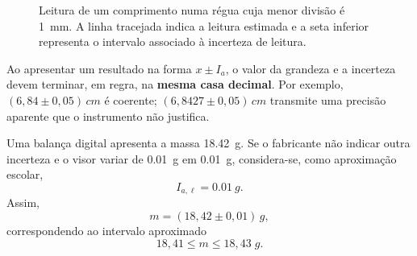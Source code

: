 \documentclass[11pt,a4paper,openany]{book}
\begin{document}
\begin{figure}[H]
\centering
{}
\caption{Leitura de um comprimento numa régua cuja menor divisão é \SI{1}{mm}. A linha tracejada indica a leitura estimada e a seta inferior representa o intervalo associado à incerteza de leitura.}
\label{fig:regua-incerteza}
\end{figure}

\begin{nota}
Ao apresentar um resultado na forma $x\pm I_a$, o valor da grandeza e a incerteza devem terminar, em regra, na \textbf{mesma casa decimal}. Por exemplo, $(6,84\pm0,05)\,\si{cm}$ é coerente; $(6,8427\pm0,05)\,\si{cm}$ transmite uma precisão aparente que o instrumento não justifica.
\end{nota}

\begin{exemploresolvido}
Uma balança digital apresenta a massa \SI{18.42}{g}. Se o fabricante não indicar outra incerteza e o visor variar de \SI{0.01}{g} em \SI{0.01}{g}, considera-se, como aproximação escolar,
\[
I_{a,\ell}=\SI{0.01}{g}.
\]
Assim,
\[
\boxed{m=(18,42\pm0,01)\,\si{g}},
\]
correspondendo ao intervalo aproximado
\[
18,41\leq m\leq18,43\;\si{g}.
\]
\end{exemploresolvido}
\end{document}
